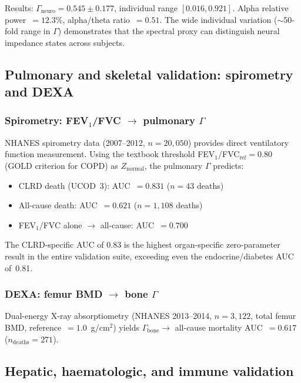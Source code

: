 \documentclass[aps,pre,twocolumn,superscriptaddress,floatfix]{revtex4-2}
\begin{document}
Results: $\Gamma_{\text{neuro}} = 0.545 \pm 0.177$,
individual range $[0.016, 0.921]$.
Alpha relative power~$= 12.3\%$,
alpha/theta ratio~$= 0.51$.
The wide individual variation ($\sim$50-fold range in
$\Gamma$) demonstrates that the spectral proxy can
distinguish neural impedance states across subjects.


\subsection{Pulmonary and skeletal validation: spirometry and DEXA}
\label{sec:pulm-bone}

\subsubsection{Spirometry: FEV$_1$/FVC $\to$ pulmonary $\Gamma$}

NHANES spirometry data (2007--2012, $n = 20{,}050$) provides
direct ventilatory function measurement.
Using the textbook threshold FEV$_1$/FVC$_{\text{ref}} = 0.80$
(GOLD criterion for COPD) as $Z_{\text{normal}}$,
the pulmonary $\Gamma$ predicts:

\begin{itemize}
  \item CLRD death (UCOD~3): AUC~$= \mathbf{0.831}$ ($n = 43$ deaths)
  \item All-cause death: AUC~$= 0.621$ ($n = 1{,}108$ deaths)
  \item FEV$_1$/FVC alone $\to$ all-cause: AUC~$= 0.700$
\end{itemize}

The CLRD-specific AUC of 0.83 is the highest organ-specific
zero-parameter result in the entire validation suite,
exceeding even the endocrine/diabetes AUC of~0.81.

\subsubsection{DEXA: femur BMD $\to$ bone $\Gamma$}

Dual-energy X-ray absorptiometry (NHANES 2013--2014,
$n = 3{,}122$, total femur BMD, reference~$= 1.0$~g/cm$^2$)
yields $\Gamma_{\text{bone}} \to$ all-cause mortality
AUC~$= 0.617$ ($n_{\text{deaths}} = 271$).


\subsection{Hepatic, haematologic, and immune validation}
\label{sec:hepatic-heme}
\end{document}
